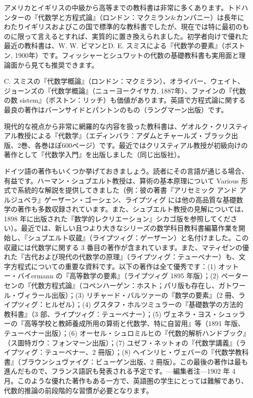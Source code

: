 \documentclass[a4paper,11pt,openany]{ltjsbook}
\begin{document}
アメリカとイギリスの中級から高等までの教科書は非常に多くあります。トドハンターの『代数学と方程式論』（ロンドン：マクミラン\&カンパニー）は長年にわたりイギリスおよびこの国で標準的な教科書でしたが、現在では特に最初のものに限って言えるとすれば、実質的に置き換えられました。初学者向けで優れた最近の教科書は、W. W. ビマンとD. E. スミスによる『代数学の要素』（ボストン, 1900年）です。フィッシャーとシュワットの代数の基礎教科書も実用面と理論面から見ても推奨できます。

C. スミスの『代数学概論』（ロンドン：マクミラン）、オライバー、ウェイト、ジョーンズの『代数学概論』（ニューヨークイサカ, 1887年）、ファインの『代数の数 sistem』（ボストン：リッチ）も価値があります。英語で方程式論に関する最良の著作はバーンサイドとパントンのもの（ラングマーン出版）です。

現代的な視点から非常に網羅的な内容を扱った教科書は、ゲオルク・クリスティアル教授による『代数学』（エディンバラ：アダムとチャールズ・ブラック出版、2巻、各巻ほぼ600ページ）です。最近ではクリスティアル教授が初級向けの著作として『代数学入門』を出版しました（同じ出版社）。

ドイツ語の著作もいくつか挙げておきましょう。読者にその言語が通じる場合、有益です。ハーマン・シュブエルト教授は、算術の基本原理について Various 形式で系統的な解説を提供してきました（例：彼の著書『アリセミック アンド アルジュベラ』ゲーザーン・ゴーシェン、ライプツィグ には他の高品質な基礎数学の著作も多数収録されています。また、シュブエルト教授の見解については、1898 年に出版された『数学的レクリエーション』シカゴ版を参照してください）。最近では、新しい且つより大きなシリーズの数学科目教科書編纂作業を開始し、『シュブエルト収蔵』（ライプツィグ：ゲーザーン）と名付けました。この収蔵には代数学に関する 3 番目の著作が含まれています。また、マティゼンの優れた『古代および現代の代数学の原理』（ライプツィグ：テューベナー）も、文字方程式についての重要な資料です。以下の著作は全て優秀です：(1) オットー・バイermann の『高等数学の要素』（ライプツィグ 1895 年版）；(2) ペーターセンの『代数方程式論』（コペンハーゲン：ホスト；パリ版も存在し、ガトワール・ヴィラール出版）；(3) リチャード・バルツァーの『数学の要素』（2 冊、ライプツィグ：ヒルゼル）；(4) グスタフ・ホルツミュラーの『基礎数学の方法的教科書』（3 部、ライプツィグ：テューベナー）；(5) ヴェネラ・ヨス・シュッラーの『高等学校と教師養成所用の算術と代数学、特に自習用』等（1891 年版、テューベナー出版）；(6) オーセル・シュロミルヒの『代数的解析ハンドブック』（ス圖特ガウ：フォンマーン出版）；(7) ユゼフ・ネットォの『代数学講義』（ライプツィグ：テューベナー、2 冊版）；(8) ヘインリヒ・ヴェバーの『代数学教科書』（ブラウンシュヴァイグ：ビューゲン出版、2 冊版）。この最後の著作は最も進んだもので、フランス語訳も発表される予定です。---編集者注---1902 年 4 月。このような優れた著作もある一方で、英語圏の学生にとっては難解であり、代数的推論の前段階的な習慣が必要となります。
\end{document}
